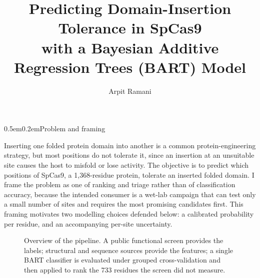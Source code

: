 \documentclass[10pt]{article}
\title{\vspace{-1.2cm}\textbf{\large Predicting Domain-Insertion Tolerance in SpCas9\\
with a Bayesian Additive Regression Trees (BART) Model}}
\author{Arpit Ramani}
\date{}
\makeatletter
\renewcommand\section{\@startsection{section}{1}{0pt}%
  {0.5em}{0.2em}{\normalsize\bfseries}}
\makeatother
\begin{document}
\maketitle
\vspace{-0.8cm}

\section{Problem and framing}

Inserting one folded protein domain into another is a common protein-engineering strategy, but
most positions do not tolerate it, since an insertion at an unsuitable site causes the host to
misfold or lose activity. The objective is to predict which positions of SpCas9, a 1{,}368-residue
protein, tolerate an inserted folded domain. I frame the problem as one of ranking and triage
rather than of classification accuracy, because the intended consumer is a wet-lab campaign that
can test only a small number of sites and requires the most promising candidates first. This
framing motivates two modelling choices defended below: a calibrated probability per residue, and
an accompanying per-site uncertainty.

\begin{figure}[h]
\centering
{}
\caption{Overview of the pipeline. A public functional screen provides the labels; structural and
sequence sources provide the features; a single BART classifier is evaluated under grouped
cross-validation and then applied to rank the 733 residues the screen did not measure.}
\label{fig:pipeline}
\end{figure}
\end{document}

